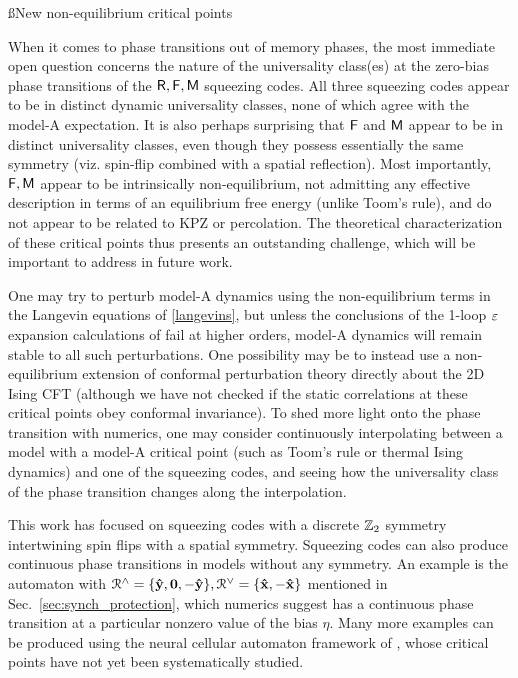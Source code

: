 \documentclass[pra,aps,twocolumn,groupedaddress,superscriptaddress,nofootinbib,preprintnumbers]{revtex4-2}
\begin{document}
	
	\ss{New non-equilibrium critical points}
	
	When it comes to phase transitions out of memory phases, the most immediate open question concerns the nature of the universality class(es) at the zero-bias phase transitions of the $\mathsf{R},\mathsf{F},\mathsf{M}$ squeezing codes. All three squeezing codes appear to be in distinct dynamic universality classes, none of which agree with the model-A expectation. It is also perhaps surprising that $\mathsf{F}$ and $\mathsf{M}$ appear to be in distinct universality classes, even though they possess essentially the same symmetry (viz. spin-flip combined with a spatial reflection). Most importantly, $\mathsf{F},\mathsf{M}$ appear to be intrinsically non-equilibrium, not admitting any effective description in terms of an equilibrium free energy (unlike Toom's rule), and do not appear to be related to KPZ or percolation. The theoretical characterization of these critical points thus presents an outstanding challenge, which will be important to address in future work. 
	
	One may try to perturb model-A dynamics using the non-equilibrium terms in the Langevin equations of \eqref{langevins}, but unless the conclusions of the 1-loop $\varepsilon$ expansion calculations of \cite{bassler1994critical,tauber2002effects} fail at higher orders, model-A dynamics will remain stable to all such perturbations. One possibility may be to instead use a non-equilibrium extension of conformal perturbation theory directly about the 2D Ising CFT (although we have not checked if the static correlations at these critical points obey conformal invariance).
	To shed more light onto the phase transition with numerics, one may consider continuously interpolating between a model with a model-A critical point (such as Toom's rule or thermal Ising dynamics) and one of the squeezing codes, and seeing how the universality class of the phase transition changes along the interpolation. 
	
	This work has focused on squeezing codes with a discrete $\mathbb{Z}_2$ symmetry intertwining spin flips with a spatial symmetry.
	Squeezing codes can also produce continuous phase transitions in models without any symmetry. An example is the automaton with $\mathcal{R}^\wedge = \{{\mathbf{\hat y}},{\mathbf{0}},-{\mathbf{\hat y}}\}, \mathcal{R}^\vee = \{{\mathbf{\hat x}},-{\mathbf{\hat x}}\}$ mentioned in Sec.~\ref{sec:synch_protection}, which numerics suggest has a continuous phase transition at a particular nonzero value of the bias $\eta$. Many more examples can be produced using the neural cellular automaton framework of \cite{pajouheshgar2025exploring}, whose critical points have not yet been systematically studied. 
	
\end{document}
